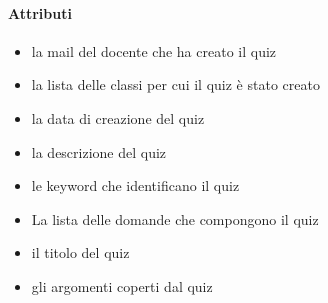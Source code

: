 \paragraph{Attributi}
\begin{itemize}
\item {}
\newline
la mail del docente che ha creato il quiz
\item {}
\newline
la lista delle classi per cui il quiz è stato creato
\item {}
\newline
la data di creazione del quiz
\item {}
\newline
la descrizione del quiz
\item {}
\newline
le keyword che identificano il quiz
\item {}
\newline
La lista delle domande che compongono il quiz
\item {}
\newline
il titolo del quiz
\item {}
\newline
gli argomenti coperti dal quiz
\end{itemize}
